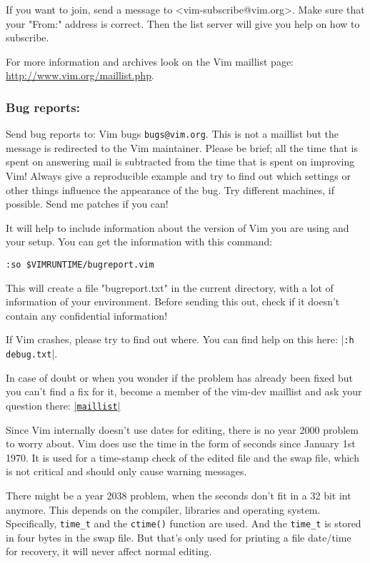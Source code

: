 \label{subscribe-maillist}
If you want to join, send a message to <vim-subscribe@vim.org>.
Make sure that your "From:" address is correct.
Then the list server will give you help on how to subscribe.


\label{maillist-archive}
For more information and archives look on the Vim maillist page: \url{http://www.vim.org/maillist.php}. %

\subsubsection{Bug reports:}
\label{bugs}
\label{bug-reports}
\label{bugreport.vim}
Send bug reports to: Vim bugs \texttt{bugs@vim.org}.
This is not a maillist but the message is redirected to the Vim maintainer.
Please be brief; all the time that is spent on answering mail is subtracted from the time that is spent on improving Vim!
Always give a reproducible example and try to find out which settings or other things influence the appearance of the bug.
Try different machines, if possible.
Send me patches if you can!

It will help to include information about the version of Vim you are using and your setup.
You can get the information with this command:
\begin{Verbatim}[samepage=true]
	 :so $VIMRUNTIME/bugreport.vim
\end{Verbatim}
This will create a file "bugreport.txt" in the current directory, with a lot of information of your environment.
Before sending this out, check if it doesn't contain any confidential information!

If Vim crashes, please try to find out where.
You can find help on this here: |\texttt{:h debug.txt}|.

In case of doubt or when you wonder if the problem has already been fixed but
you can't find a fix for it, become a member of the vim-dev maillist and ask
your question there: \hyperref[maillist]{|\texttt{maillist}|}


\label{year-2000}
\label{Y2K}
Since Vim internally doesn't use dates for editing, there is no year 2000 problem to worry about.
Vim does use the time in the form of seconds since January 1st 1970.
It is used for a time-stamp check of the edited file and the swap file, which is not critical and should only cause warning messages.

There might be a year 2038 problem, when the seconds don't fit in a 32 bit int anymore.
This depends on the compiler, libraries and operating system.
Specifically, \texttt{time\_t} and the \texttt{ctime()} function are used.
And the \texttt{time\_t} is stored in four bytes in the swap file.
But that's only used for printing a file date/time for recovery, it will never affect normal editing.

